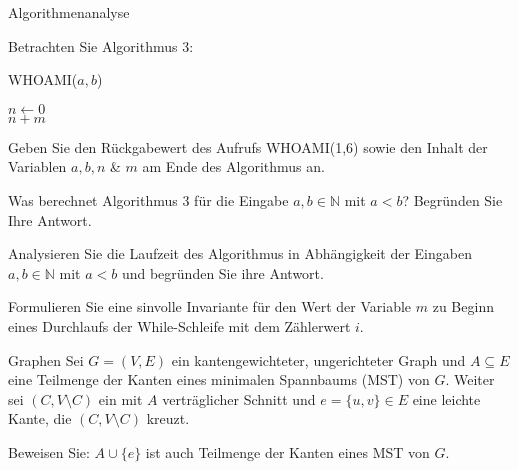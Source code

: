 \documentclass{exercisesheet}
\begin{document}
\begin{eexercises}{Algorithmenanalyse}{
    Betrachten Sie Algorithmus 3:
    \begin{algorithm}[ht]
      \caption{WHOAMI($a, b$)}
      $n \gets 0$ \\
      \Return $n + m$
    \end{algorithm}
  }
  \item Geben Sie den Rückgabewert des Aufrufs WHOAMI(1,6) sowie den Inhalt der Variablen $a, b, n$ \& $m$ am Ende des Algorithmus an.
  \item Was berechnet Algorithmus 3 für die Eingabe $a, b \in \mathbb{N}$ mit $a < b$? Begründen Sie Ihre Antwort.
  \item Analysieren Sie die Laufzeit des Algorithmus in Abhängigkeit der Eingaben $a, b \in \mathbb{N}$ mit $a < b$ und begründen Sie ihre Antwort.
  \item Formulieren Sie eine sinvolle Invariante für den Wert der Variable $m$ zu Beginn eines Durchlaufs der While-Schleife mit dem Zählerwert $i$.
\end{eexercises}

\begin{exercise}{Graphen}
  Sei $G = (V, E)$ ein kantengewichteter, ungerichteter Graph und $A \subseteq E$ eine Teilmenge der Kanten eines minimalen Spannbaums (MST) von $G$. Weiter sei $(C, V \setminus C)$ ein mit $A$ verträglicher Schnitt und $e = \{u, v\} \in E$ eine leichte Kante, die $(C, V \setminus C)$ kreuzt.\par
  Beweisen Sie: $A \cup \{e\}$ ist auch Teilmenge der Kanten eines MST von $G$.
\end{exercise}
\end{document}
